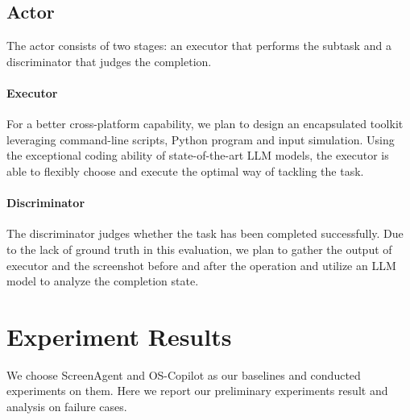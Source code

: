 \documentclass[11pt,letterpaper]{article}
\begin{document}
\subsection{Actor}
% 
The actor consists of two stages: an executor that performs the subtask and a discriminator that judges the completion. 
%
\paragraph{Executor}
%
For a better cross-platform capability, we plan to design an encapsulated toolkit leveraging command-line scripts, Python program and input simulation. 
% 
Using the exceptional coding ability of state-of-the-art LLM models, the executor is able to flexibly choose and execute the optimal way of tackling the task.
%
\paragraph{Discriminator}
%
The discriminator judges whether the task has been completed successfully. 
%
Due to the lack of ground truth in this evaluation, we plan to gather the output of executor and the screenshot before and after the operation and utilize an LLM model to analyze the completion state.
%
\section{Experiment Results}

%
We choose ScreenAgent\cite{screenagent} and OS-Copilot\cite{wu2024copilot} as our baselines and conducted experiments on them. Here we report our preliminary experiments result and analysis on failure cases.
%
\end{document}
